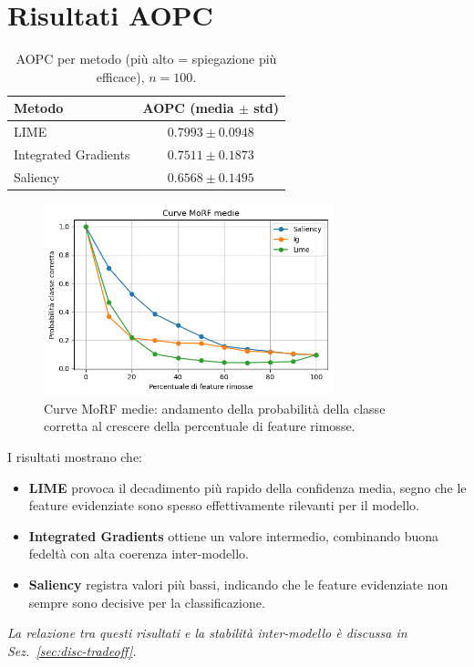 \documentclass[12pt,a4paper,oneside]{report}
\numberwithin{figure}{chapter}
\numberwithin{table}{chapter}
\begin{document}
\section{Risultati AOPC}
\begin{table}[h!]
      \centering
      \renewcommand{\arraystretch}{1.1}
      \begin{tabular}{lc}
            \hline
            \textbf{Metodo}      & \textbf{AOPC (media $\pm$ std)} \\
            \hline
            LIME                 & $0.7993 \pm 0.0948$             \\
            Integrated Gradients & $0.7511 \pm 0.1873$             \\
            Saliency             & $0.6568 \pm 0.1495$             \\
            \hline
      \end{tabular}
      \caption{AOPC per metodo (più alto = spiegazione più efficace), $n=100$.}
      \label{tab:aopc_results}
\end{table}

\begin{figure}[h!]
      \centering
      \includegraphics[width=0.75\textwidth]{images/grafMorf.png}
      \caption{Curve MoRF medie: andamento della probabilità della classe corretta al crescere della percentuale di feature rimosse.}
      \label{fig:morf_curves}
\end{figure}

\noindent
I risultati mostrano che:
\begin{itemize}
      \item \textbf{LIME} provoca il decadimento più rapido della confidenza media, segno che le feature evidenziate sono spesso effettivamente rilevanti per il modello.
      \item \textbf{Integrated Gradients} ottiene un valore intermedio, combinando buona fedeltà con alta coerenza inter-modello.
      \item \textbf{Saliency} registra valori più bassi, indicando che le feature evidenziate non sempre sono decisive per la classificazione.
\end{itemize}
{\small\textit{La relazione tra questi risultati e la stabilità inter-modello è discussa in
      Sez.~\ref{sec:disc-tradeoff}.}}
\end{document}
